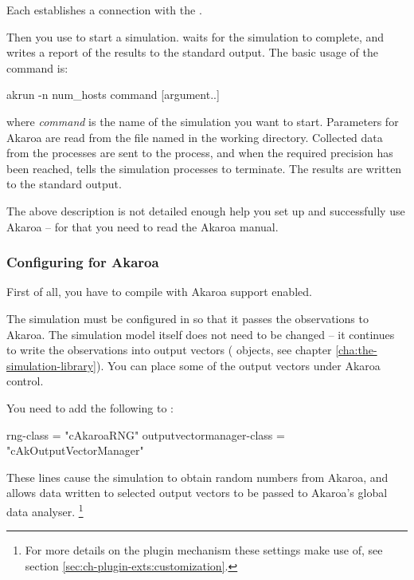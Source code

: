 Each  establishes a connection with the .

Then you use  to start a simulation.  waits
for the simulation to complete, and writes a report of the results
to the standard output. The basic usage of the  command is:

\begin{commandline}
akrun -n num_hosts command [argument..]
\end{commandline}

where \textit{command} is the name of the simulation you want to start.
Parameters for Akaroa are read from the file named  in
the working directory. Collected data from the processes are
sent to the  process, and when the required precision
has been reached,  tells the simulation processes to
terminate. The results are written to the standard output.

The above description is not detailed enough help you
set up and successfully use Akaroa -- for that you need to read the
Akaroa manual.

\subsubsection{Configuring {\opp} for Akaroa}

First of all, you have to compile {\opp} with Akaroa support enabled.

The {\opp} simulation must be configured in 
so that it passes the observations to Akaroa. The simulation model itself does
not need to be changed -- it continues to write
the observations into output vectors ( objects,
see chapter \ref{cha:the-simulation-library}). You can place some of
the output vectors under Akaroa control.

You need to add the following to :

\begin{inifile}
[General]
rng-class = "cAkaroaRNG"
outputvectormanager-class = "cAkOutputVectorManager"
\end{inifile}

These lines cause the simulation to obtain random numbers from Akaroa,
and allows data written to selected output vectors to be passed to Akaroa's
global data analyser.
    \footnote{For more details on the plugin mechanism these settings make use of,
    see section \ref{sec:ch-plugin-exts:customization}.}

